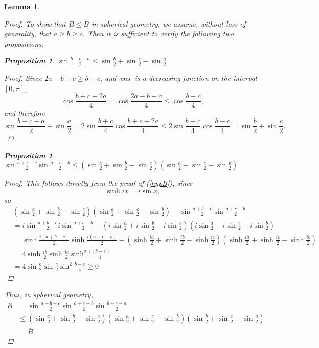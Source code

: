 \documentclass[12pt,notitlepage]{amsart}%
\newtheorem{lemma}[theorem]{Lemma}
\newtheorem{proposition}[theorem]{Proposition}
\newcommand{\s}[1]{\sin \frac{#1}{2}}
\newcommand{\sh}[1]{\sinh \frac{#1}{2}}
\newcommand{\f}[1]{\sin \frac{#1}{4}}
\begin{document}
\begin{lemma}
\begin{proof}
    To show that $B\leq\bar{B}$ in spherical geometry, we assume, without loss of generality, that $a\geq b \geq c$.  Then it is sufficient to verify the following two propositions:
    \begin{proposition}
    $\s{b+c-a}\leq\s{b}+\s{c}-\s{a}$
		\begin{proof}
        Since $2a-b-c\geq b-c$, and $\cos$ is a decreasing function on the interval $[0,\pi]$, \[\cos\frac{b+c-2a}{4}=\cos\frac{2a-b-c}{4}\leq\cos\frac{b-c}{4},\]
        and therefore
        \[\s{b+c-a}+\s{a}=2\f{b+c}\cos\frac{b+c-2a}{4}\leq2\f{b+c}\cos\frac{b-c}{4}=\s{b}+\s{c}.\]
		\end{proof}
	\end{proposition}
    \begin{proposition}
    $\s{a+b-c}\s{a+c-b}\leq\left( \s{a}+\s{b}-\s{c}\right) \left( \s{a}+\s{c}-\s{b}\right) $
    \begin{proof}
	This follows directly from the proof of (\ref{hypB}), since \[\sinh ix=i\sin x,\] so 
    \begin{align*}
    &\left( \s{a}+\s{b}-\s{c}\right)\left( \s{a}+\s{c}-\s{b}\right)-\s{a+b-c}\s{a+c-b}\\
    &=i\s{a+b-c}i\s{a+c-b}-\left( i\s{a}+i\s{b}-i\s{c}\right) \left( i\s{a}+i\s{c}-i\s{b}\right) \\
    &=\sh{i(a+b-c)}\sh{i(a+c-b)}-\left(\sh{ia}+\sh{ib}-\sh{ic}\right)\left(\sh{ia}+\sh{ic}-\sh{ib}\right)\\
    &=4\sh{ib}\sh{ic}\sinh^2\frac{i(b-c)}{4}\\
    &=4\s{b}\s{c}\sin^2\frac{b-c}{4}\geq 0
    \end{align*}
    \end{proof}
    \end{proposition}
    Thus, in spherical geometry, 
    \begin{align*}
    B&=\s{a+b-c}\s{a+c-b}\s{b+c-a}\\
    &\leq(\s{a}+\s{b}-\s{c})(\s{a}+\s{c}-\s{b})(\s{b}+\s{c}-\s{a})\\
    &=\bar{B}
    \end{align*}
\end{proof}
\end{lemma}
\end{document}
